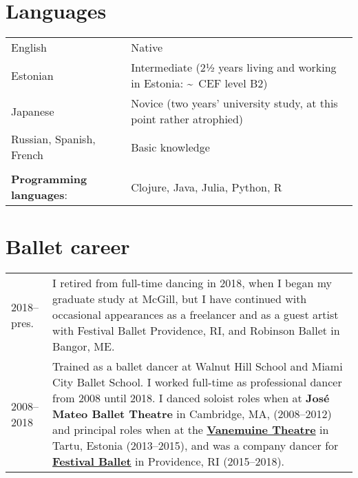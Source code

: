 \documentclass[11pt,a4paper]{article}
\begin{document}
  \section{Languages}

  \begin{longtable}[l]{ll}
    English
    &%
      Native\\
    Estonian 
    &%
      Intermediate (2½ years living and working in Estonia:
      \textasciitilde\ CEF level B2)\\
    Japanese
    &%
      Novice (two years' university study, at this point rather atrophied)\\
    Russian, Spanish, French%
    &%
      Basic knowledge\\
    \multicolumn{2}{c}{}\\
    \textbf{Programming languages}:
    &%
      Clojure, Java, Julia, Python, R
  \end{longtable}

  \section{Ballet career}
  \begin{longtable}{p{1.7cm}|p{15cm}}
    2018--pres.
    &%
      I retired from full-time dancing in 2018, when I began my graduate study
      at McGill, but I have continued with occasional appearances as a
      freelancer and as a guest artist with Festival Ballet Providence, RI,
      and Robinson Ballet in Bangor,
      ME.\\
    \textsc{2008--2018}
    &%
      Trained as a ballet dancer at Walnut Hill School and Miami City Ballet
      School. I worked full-time as professional dancer from 2008 until 2018. I
      danced soloist roles when at \textbf{José Mateo Ballet Theatre} in
      Cambridge, MA, (2008--2012) and principal roles when at the
      \href{http://vanemuine.ee}{\textbf{Vanemuine Theatre}} in Tartu, Estonia
      (2013--2015), and was a company dancer for
      \href{http://festivalballetprovidence.org}{\textbf{Festival Ballet}} in
      Providence, RI (2015--2018).\\
  \end{longtable}

  
\end{document}
